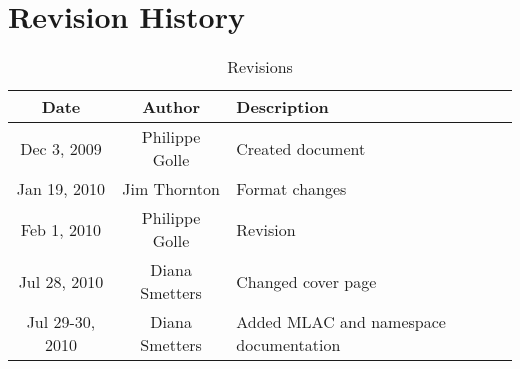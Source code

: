 \documentclass[11pt]{article}
\newcommand\T{\rule{0pt}{2.6ex}}
\theoremstyle{definition}
\begin{document}




\tableofcontents
\newpage

\section*{Revision History}
\begin{table}[ht]
\caption{Revisions}
\begin{tabular}{c c l}
\hline\hline
\T
Date & Author & Description \\
\hline
\T
Dec 3, 2009 & Philippe Golle & Created document \\
\hline
\T
Jan 19, 2010 & Jim Thornton & Format changes \\
\hline
\T
Feb 1, 2010 & Philippe Golle & Revision \\
\hline
\T
Jul 28, 2010 & Diana Smetters & Changed cover page \\
\hline
\T
Jul 29-30, 2010 & Diana Smetters & Added MLAC and namespace documentation \\
\hline
\end{tabular}
\label{tab:revisions}
\end{table}
\cleardoublepage




%

%

% 
%
%

%
% 
%
%
\end{document}
